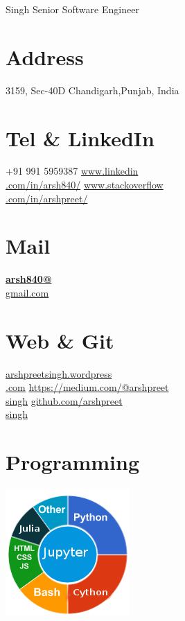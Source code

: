 \documentclass[]{friggeri-cv}
\begin{document}
     {Singh}
      {Senior Software Engineer}


\begin{aside}
  \section{Address}
    3159, Sec-40D
    Chandigarh,Punjab, India
    ~
  \section{Tel \& LinkedIn}
    +91 991 5959387
    \href{http://www.linkedin.com/in/arsh840/}{www.linkedin\\.com/in/arsh840/}
    \href{https://stackoverflow.com/users/1540739/arshpreet}{www.stackoverflow\\.com/in/arshpreet/}
    ~
  \section{Mail}
    \href{mailto:arsh840@gmail.com}{\textbf{arsh840@}\\gmail.com}
    ~
  \section{Web \& Git}
    \href{http://www.arshpreetsingh.wordpress.com}{arshpreetsingh.wordpress\\.com}
    \href{https://medium.com/@arshpreetsingh}{https://medium.com/@arshpreet\\singh}
    \href{https://github.com/arshpreetsingh}{github.com/arshpreet\\singh}
    ~
  \section{Programming}
    \includegraphics[scale=0.62]{img/programming.png}
    ~

\end{aside}
\end{document}
